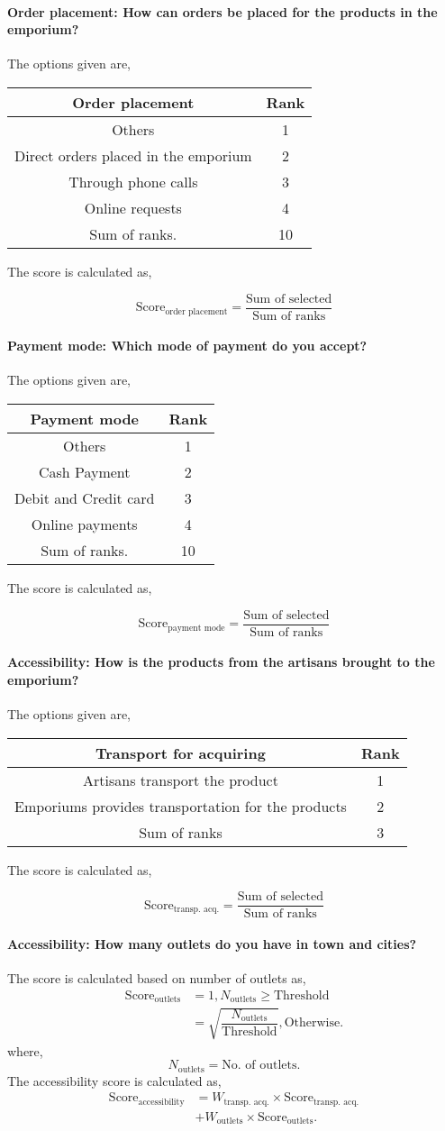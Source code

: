 \documentclass[oneside,twocolumn]{article}
\newcommand{\tsub}[2]{\text{#1}_{\text{#2}}}
\newcommand{\tsubb}[2]{#1_{\text{#2}}}
\newcommand{\dsub}[2]{\dfrac{\text{#1}}{\text{#2}}}
\newcommand{\multsel}[1]
{
	\[
		\tsub{Score}{#1} = \dsub{Sum of selected}{Sum of ranks}
	\]
}
\newenvironment{ttable}
{
\begin{center}
\begin{tabular}{c|c}
\hline
}
{
\\ \hline
\end{tabular}
\end{center}
}
\begin{document}
\paragraph{Order placement: How can orders be placed for the products in the emporium?}
The options given are,
\begin{ttable}
	Order placement & Rank \\ \hline
	Others & 1 \\
	Direct orders placed in the emporium & 2 \\
	Through phone calls & 3 \\
	Online requests & 4 \\ \hline
	Sum of ranks. & 10
\end{ttable}
The score is calculated as,
\multsel{order placement}
\paragraph{Payment mode: Which mode of payment do you accept?}
The options given are,
\begin{ttable}
	Payment mode & Rank \\ \hline
	Others & 1 \\
	Cash Payment & 2 \\
	Debit and Credit card & 3 \\
	Online payments & 4 \\ \hline
	Sum of ranks. & 10
\end{ttable}
The score is calculated as,
\multsel{payment mode}
\paragraph{Accessibility: How is the products from the artisans brought to the emporium?}
The options given are,
\begin{ttable}
	Transport for acquiring & Rank \\ \hline
	Artisans transport the product & 1 \\
	Emporiums provides transportation for the products & 2 \\ \hline
	Sum of ranks & 3
\end{ttable}
The score is calculated as,
\multsel{transp. acq.}
\paragraph{Accessibility: How many outlets do you have in town and cities?}
The score is calculated based on number of outlets as,
\begin{align*}
	\tsub{Score}{outlets} &= 1, \tsubb{N}{outlets} \ge \text{Threshold} \\
	&= \sqrt{\dfrac{\tsubb{N}{outlets}}{\text{Threshold}}}, \text{Otherwise}.
\end{align*}
where,
\[
	\tsubb{N}{outlets} = \text{No. of outlets}.
\]
The accessibility score is calculated as,
\begin{align*}
	\tsub{Score}{accessibility} &= \tsubb{W}{transp. acq.} \times \tsub{Score}{transp. acq.} \\
	&+ \tsubb{W}{outlets} \times \tsub{Score}{outlets}.
\end{align*}
\end{document}
